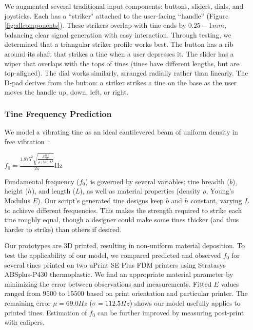         We augmented several traditional input components: buttons, sliders, dials, and joysticks. Each has a ``striker" attached to the user-facing ``handle'' (Figure \ref{fig:allcomponents}).  These strikers overlap with tine ends by $0.25-1mm$, balancing clear signal generation with easy interaction. Through testing, we determined that a triangular striker profile works best.
The button has a rib around its shaft that strikes a tine when a user depresses it.  The slider has a wiper that overlaps with the tops of tines (tines have different lengths, but are top-aligned).  The dial works similarly, arranged radially rather than linearly.  The D-pad derives from the button: a striker strikes a tine on the base as the user moves the handle up, down, left, or right.

        \subsubsection{Tine Frequency Prediction}
        
        

        We model a vibrating tine as an ideal cantilevered beam of uniform density in free vibration~\cite{Meirovitch-analytical}: 

            \begin{center}
             $f_0 = \frac{1.875^2 \sqrt{\frac{E\frac{bh^3}{12}}{\rho (bh)L^4}}}{2\pi}$Hz
            \end{center}

            Fundamental frequency ($f_0$) is governed by several variables: tine breadth ($b$), height ($h$), and length ($L$), as well as material properties (density $\rho$, Young's Modulus $E$). Our script's generated tine designs keep $b$ and $h$ constant, varying $L$ to achieve different frequencies. This makes the strength required to strike each tine roughly equal, though a designer could make some tines thicker (and thus harder to strike) than others if desired.

            Our prototypes are 3D printed, resulting in non-uniform material deposition. To test the applicability of our model, we compared predicted and observed $f_0$ for several tines printed on two uPrint SE Plus FDM printers using Stratasys ABSplus-P430 thermoplastic. We find an appropriate material parameter by minimizing the error between observations and measurements. Fitted $E$ values ranged from $9500$ to $15500$ based on print orientation and particular printer.  The remaining error $\mu= 69.0Hz$ ($\sigma= 112.5Hz$) shows our model usefully applies to printed tines. Estimation of $f_0$ can be further improved by measuring post-print with calipers. 

